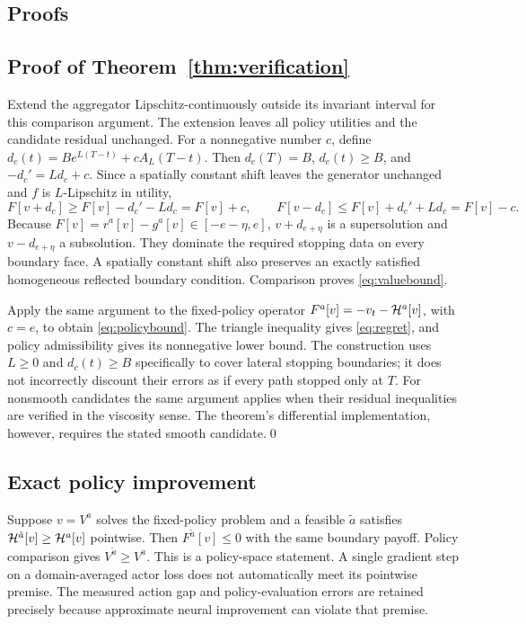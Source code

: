 \begin{appendix}
\section{Proofs}\label{app:proofs}
\subsection{Proof of Theorem~\ref{thm:verification}}
Extend the aggregator Lipschitz-continuously outside its invariant interval for this comparison argument. The extension leaves all policy utilities and the candidate residual unchanged. For a nonnegative number $c$, define $d_c(t)=Be^{L(T-t)}+cA_L(T-t)$. Then $d_c(T)=B$, $d_c(t)\geq B$, and $-d_c'=Ld_c+c$. Since a spatially constant shift leaves the generator unchanged and $f$ is $L$-Lipschitz in utility,
\[
 F[v+d_c]\geq F[v]-d_c'-Ld_c=F[v]+c,
 \qquad F[v-d_c]\leq F[v]+d_c'+Ld_c=F[v]-c.
\]
Because $F[v]=r^a[v]-g^a[v]\in[-e-\eta,e]$, $v+d_{e+\eta}$ is a supersolution and $v-d_{e+\eta}$ a subsolution. They dominate the required stopping data on every boundary face. A spatially constant shift also preserves an exactly satisfied homogeneous reflected boundary condition. Comparison proves \eqref{eq:valuebound}.

Apply the same argument to the fixed-policy operator $F^a[v]=-v_t-\mathcal H^a[v]$, with $c=e$, to obtain \eqref{eq:policybound}. The triangle inequality gives \eqref{eq:regret}, and policy admissibility gives its nonnegative lower bound. The construction uses $L\geq0$ and $d_c(t)\geq B$ specifically to cover lateral stopping boundaries; it does not incorrectly discount their errors as if every path stopped only at $T$. For nonsmooth candidates the same argument applies when their residual inequalities are verified in the viscosity sense. The theorem's differential implementation, however, requires the stated smooth candidate.\qed

\subsection{Exact policy improvement}
Suppose $v=V^a$ solves the fixed-policy problem and a feasible $\tilde a$ satisfies $\mathcal H^{\tilde a}[v]\geq\mathcal H^a[v]$ pointwise. Then $F^{\tilde a}[v]\leq0$ with the same boundary payoff. Policy comparison gives $V^{\tilde a}\geq V^a$. This is a policy-space statement. A single gradient step on a domain-averaged actor loss does not automatically meet its pointwise premise. The measured action gap and policy-evaluation errors are retained precisely because approximate neural improvement can violate that premise.


\end{appendix}
